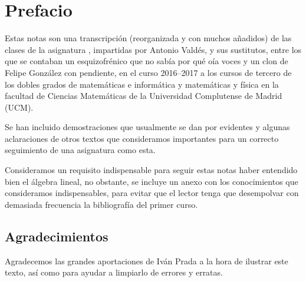 \section*{Prefacio}
Estas notas son una transcripción (reorganizada y con muchos añadidos) de las clases de la asignatura , impartidas por Antonio Valdés, y sus sustitutos, entre los que se contaban un esquizofrénico que no sabía por qué oía voces y un clon de Felipe González con pendiente, en el curso 2016--2017 a los cursos de tercero de los dobles grados de matemáticas e informática y matemáticas y física en la facultad de Ciencias Matemáticas de la Universidad Complutense de Madrid (UCM).

Se han incluido demostraciones que usualmente se dan por evidentes y algunas aclaraciones de otros textos que consideramos importantes para un correcto seguimiento de una asignatura como esta.

Consideramos un requisito indispensable para seguir estas notas haber entendido bien el álgebra lineal, no obstante, se incluye un anexo con los conocimientos que consideramos indispensables, para evitar que el lector tenga que desempolvar con demasiada frecuencia la bibliografía del primer curso.
\subsection*{Agradecimientos}
Agradecemos las grandes aportaciones de Iván Prada a la hora de ilustrar este texto, así como para ayudar a limpiarlo de errores y erratas.
